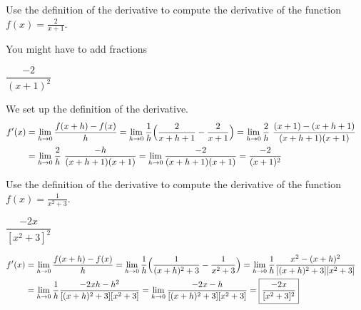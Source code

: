 \begin{Mquestion}[1997A]Use the definition of the derivative to compute the derivative
of the function $f(x)=\frac{2}{x+1}$.
\end{Mquestion}
\begin{hint} You might have to add fractions
\end{hint}
\begin{answer} $\dfrac{-2}{(x+1)^2}$
\end{answer}
\begin{solution}
We set up the definition of the derivative.
\begin{align*}
f'(x)&=\lim_{h\rightarrow 0}\frac{f(x+h)-f(x)}{h}
=\lim_{h\rightarrow 0}\frac{1}{h}\Big(\frac{2}{x+h+1}
-\frac{2}{x+1}\Big)
=\lim_{h\rightarrow 0}\frac{2}{h}\ \frac{(x+1)-(x+h+1)}{(x+h+1)(x+1)}\cr
&=\lim_{h\rightarrow 0}\frac{2}{h}\ \frac{-h}{(x+h+1)(x+1)}
=\lim_{h\rightarrow 0}\frac{-2}{(x+h+1)(x+1)}
=\frac{-2}{(x+1)^2}
\end{align*}
\end{solution}



\begin{question}[1996D]
Use the definition of the derivative to compute the derivative
of the function $f(x)=\frac{1}{x^2+3}$.
\end{question}
\begin{answer} {$\dfrac{-2x}{[x^2+3]^2}$}
\end{answer}
\begin{solution}
\begin{align*}
f'(x)&=\lim_{h\rightarrow 0}\frac{f(x+h)-f(x)}{h}
=\lim_{h\rightarrow 0}\frac{1}{h}\Big(\frac{1}{(x+h)^2+3}
-\frac{1}{x^2+3}\Big)
=\lim_{h\rightarrow 0}\frac{1}{h}\frac{x^2-(x+h)^2}{[(x+h)^2+3][x^2+3]}\cr
&=\lim_{h\rightarrow 0}\frac{1}{h}\frac{-2xh-h^2}{[(x+h)^2+3][x^2+3]}
=\lim_{h\rightarrow 0}\frac{-2x-h}{[(x+h)^2+3][x^2+3]}
=\boxed{\frac{-2x}{[x^2+3]^2}}
\end{align*}
\end{solution}







